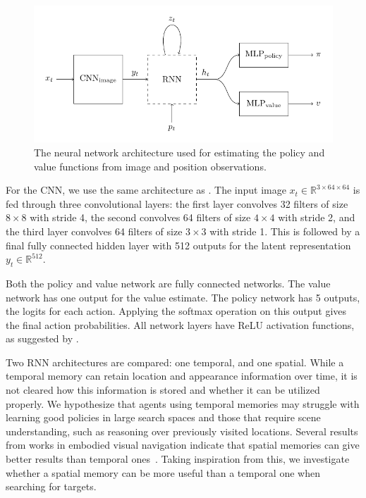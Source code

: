 \begin{figure}
    \centering
    \includegraphics{figures/architecture.pdf}
    \caption[Neural network architecture]{The neural network architecture used for estimating the policy and value functions from image and position observations.}
    \label{fig:architecture}
\end{figure}

For the CNN, we use the same architecture as \cite{mnih_human-level_2015}.
The input image \(x_t \in \mathbb{R}^{3 \times 64 \times 64}\) is fed through three convolutional layers: the first layer convolves 32 filters of size \(8 \times 8\) with stride 4, the second convolves 64 filters of size \(4 \times 4\) with stride 2, and the third layer convolves 64 filters of size \(3 \times 3\) with stride 1.
This is followed by a final fully connected hidden layer with 512 outputs for the latent representation \(y_t \in \mathbb{R}^{512}\).

Both the policy and value network are fully connected networks.
The value network has one output for the value estimate.
The policy network has 5 outputs, the logits for each action.
Applying the softmax operation on this output gives the final action probabilities.
All network layers have ReLU activation functions, as suggested by \cite{henderson_deep_2018}.

Two RNN architectures are compared: one temporal, and one spatial.
While a temporal memory can retain location and appearance information over time, it is not cleared how this information is stored and whether it can be utilized properly.
We hypothesize that agents using temporal memories may struggle with learning good policies in large search spaces and those that require scene understanding, such as reasoning over previously visited locations.
Several results from works in embodied visual navigation indicate that spatial memories can give better results than temporal ones~\cite{parisotto_neural_2017,henriques_mapnet_2018,gupta_cognitive_2019,chaplot_object_2020}.
Taking inspiration from this, we investigate whether a spatial memory can be more useful than a temporal one when searching for targets.

